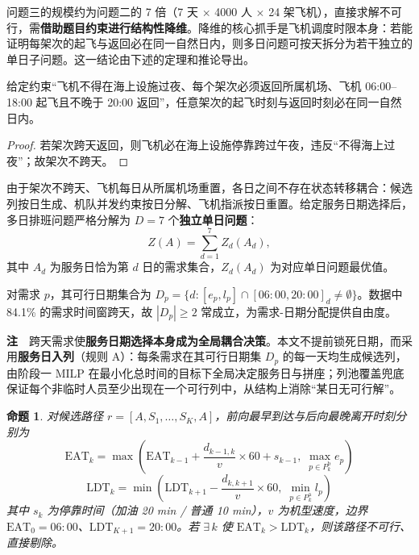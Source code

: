 \documentclass[withoutpreface]{cumcmthesis}
\newtheorem{proposition}{命题}
\begin{document}
问题三的规模约为问题二的 7 倍（7 天 $\times$ 4000 人 $\times$ 24 架飞机），直接求解不可行，需\textbf{借助题目约束进行结构性降维}。降维的核心抓手是飞机调度时限本身：若能证明每架次的起飞与返回必在同一自然日内，则多日问题可按天拆分为若干独立的单日子问题。这一结论由下述的定理和推论导出。

\begin{theorem}
\label{thm:decouple}
给定约束``飞机不得在海上设施过夜、每个架次必须返回所属机场、飞机 06:00--18:00 起飞且不晚于 20:00 返回''，任意架次的起飞时刻与返回时刻必在同一自然日内。
\end{theorem}

\begin{proof}
若架次跨天返回，则飞机必在海上设施停靠跨过午夜，违反``不得海上过夜''；故架次不跨天。
\end{proof}

\begin{corollary}
\label{cor:indep}
由于架次不跨天、飞机每日从所属机场重置，各日之间不存在状态转移耦合：候选列按日生成、机队并发约束按日分解、飞机指派按日重置。给定服务日期选择后，多日排班问题严格分解为 $D = 7$ 个\textbf{独立单日问题}：
\[
Z(A) = \sum_{d=1}^{7} Z_d(A_d),
\]
其中 $A_d$ 为服务日恰为第 $d$ 日的需求集合，$Z_d(A_d)$ 为对应单日问题最优值。
\end{corollary}

\begin{corollary}
\label{cor:dateset}
对需求 $p$，其可行日期集合为 $D_p = \{ d : [e_p, l_p] \cap [06{:}00, 20{:}00]_d \neq \emptyset \}$。数据中 84.1\% 的需求时间窗跨天，故 $|D_p| \geq 2$ 常成立，为需求-日期分配提供自由度。
\end{corollary}

\textbf{注}　跨天需求使\textbf{服务日期选择本身成为全局耦合决策}。本文不提前锁死日期，而采用\textbf{服务日入列}（规则 A）：每条需求在其可行日期集 $D_p$ 的每一天均生成候选列，由阶段一 MILP 在最小化总时间的目标下全局决定服务日与拼座；列池覆盖兜底保证每个非临时人员至少出现在一个可行列中，从结构上消除``某日无可行解''。

\begin{proposition}
\label{prop:cpm}
对候选路径 $r = [A, S_1, \ldots, S_K, A]$，前向最早到达与后向最晚离开时刻分别为
\begin{equation}
\text{EAT}_k = \max\!\left(\text{EAT}_{k-1} + \frac{d_{k-1,k}}{v} \times 60 + s_{k-1},\; \max_{p \in P_k^{\mathrm{b}}} e_p\right)
\label{eq:eat}
\end{equation}
\begin{equation}
\text{LDT}_k = \min\!\left(\text{LDT}_{k+1} - \frac{d_{k,k+1}}{v} \times 60,\; \min_{p \in P_k^{\mathrm{a}}} l_p\right)
\label{eq:ldt}
\end{equation}
其中 $s_k$ 为停靠时间（加油 20 min / 普通 10 min），$v$ 为机型速度，边界 $\text{EAT}_0 = 06{:}00$、$\text{LDT}_{K+1} = 20{:}00$。若 $\exists\, k$ 使 $\text{EAT}_k > \text{LDT}_k$，则该路径不可行、直接剔除。
\end{proposition}
\end{document}
